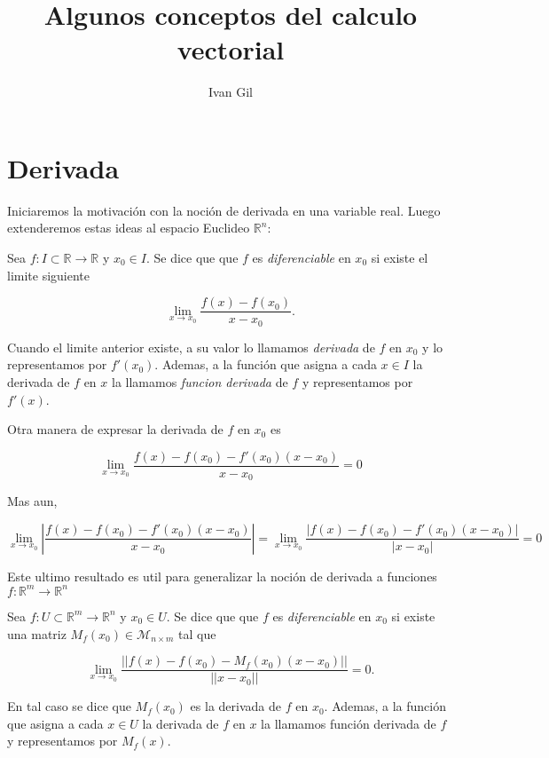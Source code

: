 \documentclass[letterpaper, 12pt]{article} %
\begin{document}
\title{Algunos conceptos del calculo vectorial}
\author{Ivan Gil}
\maketitle

\section{Derivada}

Iniciaremos la motivación con la noción de derivada en una variable real. Luego extenderemos estas ideas
al espacio Euclideo $\mathbb{R}^{n}$:

\begin{definition}
Sea $f: I \subset \mathbb{R} \longrightarrow \mathbb{R}$ y $x_{0} \in I$. Se dice que que $f$ es
{\it diferenciable} en $x_{0}$ si existe el limite siguiente

$$\lim_{x \longrightarrow x_{0}} \frac{f(x) - f(x_{0})}{x-x_{0}} \mbox{.}$$

Cuando el limite anterior existe, a su valor lo llamamos {\it derivada} de $f$ en $x_{0}$ y lo representamos
por $f'(x_{0})$. Ademas, a la función que asigna a cada $x \in I$ la derivada de $f$ en $x$ la llamamos
{\it funcion derivada} de $f$ y representamos por $f'(x)$.
\end{definition}

\begin{observation}
Otra manera de expresar la derivada de $f$ en $x_{0}$ es

$$\lim_{x \longrightarrow x_{0}} \frac{f(x) - f(x_{0}) - f'(x_{0})(x-x_{0})}{x-x_{0}} = 0$$

Mas aun,

\[
\lim_{x \longrightarrow x_{0}} \left \vert \frac{f(x) - f(x_{0}) - f'(x_{0})(x-x_{0})}{x-x_{0}}\right \vert =
\lim_{x \longrightarrow x_{0}} \frac{\vert f(x) - f(x_{0}) - f'(x_{0})(x-x_{0}) \vert}{\vert x-x_{0} \vert} = 0
\]

Este ultimo resultado es util para generalizar la noción de derivada a funciones
$f : \mathbb{R}^{m} \longrightarrow \mathbb{R}^{n}$
\end{observation}

\begin{definition}[Derivada]
Sea $f : U \subset \mathbb{R}^{m} \longrightarrow \mathbb{R}^{n}$ y $x_{0} \in U$. Se dice que que $f$ es
{\it diferenciable} en $x_{0}$ si existe una matriz $M_{f}(x_{0}) \in \mathcal{M}_{n \times m}$ tal que

$$\lim_{x \longrightarrow x_{0}} \frac{|| f(x) - f(x_{0}) - M_{f}(x_{0})(x-x_{0}) ||}{|| x-x_{0} ||} = 0 \mbox{.}$$

En tal caso se dice que $M_{f}(x_{0})$ es la derivada de $f$ en $x_{0}$. Ademas, a la función que asigna
a cada $x \in U$ la derivada de $f$ en $x$ la llamamos función derivada de $f$ y representamos por $M_{f}(x)$.
\end{definition}
\end{document}
